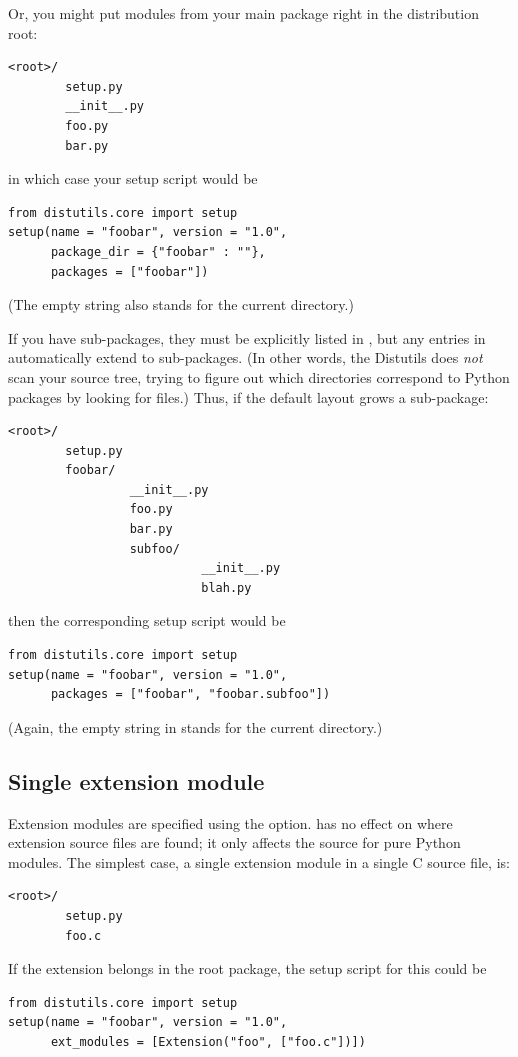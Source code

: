 \documentclass{howto}
\begin{document}
Or, you might put modules from your main package right in the
distribution root:
\begin{verbatim}
<root>/
        setup.py
        __init__.py
        foo.py
        bar.py
\end{verbatim}
in which case your setup script would be
\begin{verbatim}
from distutils.core import setup
setup(name = "foobar", version = "1.0",
      package_dir = {"foobar" : ""},
      packages = ["foobar"])
\end{verbatim}
(The empty string also stands for the current directory.)

If you have sub-packages, they must be explicitly listed in
, but any entries in 
automatically extend to sub-packages.  (In other words, the Distutils
does \emph{not} scan your source tree, trying to figure out which
directories correspond to Python packages by looking for
 files.)  Thus, if the default layout grows a
sub-package:
\begin{verbatim}
<root>/
        setup.py
        foobar/
                 __init__.py
                 foo.py
                 bar.py
                 subfoo/
                           __init__.py
                           blah.py
\end{verbatim}
then the corresponding setup script would be
\begin{verbatim}
from distutils.core import setup
setup(name = "foobar", version = "1.0",
      packages = ["foobar", "foobar.subfoo"])
\end{verbatim}
(Again, the empty string in  stands for the current
directory.)


\subsection{Single extension module}
\label{single-ext}

Extension modules are specified using the  option.
 has no effect on where extension source files are
found; it only affects the source for pure Python modules.  The simplest 
case, a single extension module in a single C source file, is:
\begin{verbatim}
<root>/
        setup.py
        foo.c
\end{verbatim}
If the  extension belongs in the root package, the setup
script for this could be
\begin{verbatim}
from distutils.core import setup
setup(name = "foobar", version = "1.0",
      ext_modules = [Extension("foo", ["foo.c"])])
\end{verbatim}
\end{document}
